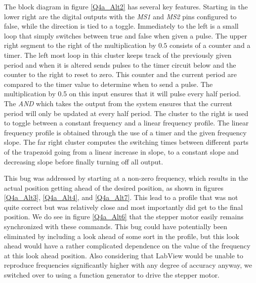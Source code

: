 \documentclass{article}
\theoremstyle{plain}
\theoremstyle{definition}
\theoremstyle{remark}
\begin{document}
The block diagram in figure \ref{Q4a_Alt2} has several key features.  Starting in the lower right are the digital outputs with the \emph{MS1} and \emph{MS2} pins configured to false, while the direction is tied to a toggle.  Immediately to the left is a small loop that simply switches between true and false when given a pulse.  The upper right segment to the right of the multiplication by $0.5$ consists of a counter and a timer.  The left most loop in this cluster keeps track of the previously given period and when it is altered sends pulses to the timer circuit below and the counter to the right to reset to zero.  This counter and the current period are compared to the timer value to determine when to send a pulse.  The multiplication by 0.5 on this input ensures that it will pulse every half period.  The \emph{AND} which takes the output from the system ensures that the current period will only be updated at every half period.  The cluster to the right is used to toggle between a constant frequency and a linear frequency profile.  The linear frequency profile is obtained through the use of a timer and the given frequency slope.  The far right cluster computes the switching times between different parts of the trapezoid going from a linear increase in slope, to a constant slope and decreasing slope before finally turning off all output. 

This bug was addressed by starting at a non-zero frequency, which results in the actual position getting ahead of the desired position, as shown in figures \ref{Q4a_Alt3}, \ref{Q4a_Alt4}, and \ref{Q4a_Alt7}.  This lead to a profile that was not quite correct but was relatively close and most importantly did get to the final position.  We do see in figure \ref{Q4a_Alt6} that the stepper motor easily remains synchronized with these commands.  This bug could have potentially been eliminated by including a look ahead of some sort in the profile, but this look ahead would have a rather complicated dependence on the value of the frequency at this look ahead position.  Also considering that LabView would be unable to reproduce frequencies significantly higher with any degree of accuracy anyway, we switched over to using a function generator to drive the stepper motor.
\end{document}
